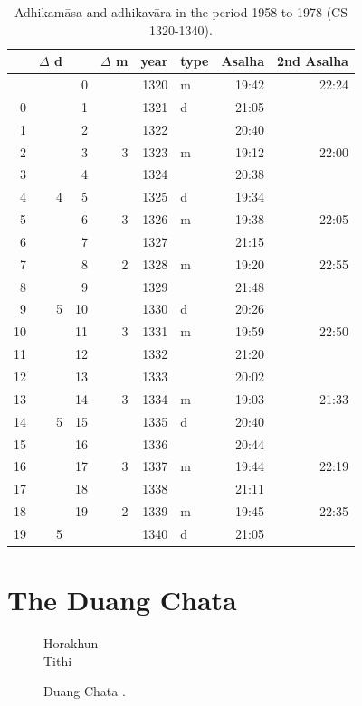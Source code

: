 \documentclass[11pt,oneside]{memoir-article}
\begin{document}
\begin{table}[p]
\caption{\label{tbl-calendars-1958} Adhikamāsa and adhikavāra in the period 1958 to 1978 (CS 1320-1340).\cite{eade-interpolation}}
\centering
\begin{tabular}{rrrrrlrr}
 & $\Delta$ d &  & $\Delta$ m & year & type & Asalha & 2nd Asalha\\
\hline
 &  & 0 &  & 1320 & m & 19:42 & 22:24\\
0 &  & 1 &  & 1321 & d & 21:05 & \\
1 &  & 2 &  & 1322 &  & 20:40 & \\
2 &  & 3 & 3 & 1323 & m & 19:12 & 22:00\\
3 &  & 4 &  & 1324 &  & 20:38 & \\
4 & 4 & 5 &  & 1325 & d & 19:34 & \\
5 &  & 6 & 3 & 1326 & m & 19:38 & 22:05\\
6 &  & 7 &  & 1327 &  & 21:15 & \\
7 &  & 8 & 2 & 1328 & m & 19:20 & 22:55\\
8 &  & 9 &  & 1329 &  & 21:48 & \\
9 & 5 & 10 &  & 1330 & d & 20:26 & \\
10 &  & 11 & 3 & 1331 & m & 19:59 & 22:50\\
11 &  & 12 &  & 1332 &  & 21:20 & \\
12 &  & 13 &  & 1333 &  & 20:02 & \\
13 &  & 14 & 3 & 1334 & m & 19:03 & 21:33\\
14 & 5 & 15 &  & 1335 & d & 20:40 & \\
15 &  & 16 &  & 1336 &  & 20:44 & \\
16 &  & 17 & 3 & 1337 & m & 19:44 & 22:19\\
17 &  & 18 &  & 1338 &  & 21:11 & \\
18 &  & 19 & 2 & 1339 & m & 19:45 & 22:35\\
19 & 5 &  &  & 1340 & d & 21:05 & \\
\end{tabular}
\end{table}


\clearpage

\chapter{The Duang Chata}
\label{sec-4}

\begin{figure}[h]
\caption{Duang Chata .}

Horakhun\\
Tithi

\end{figure}
\end{document}

